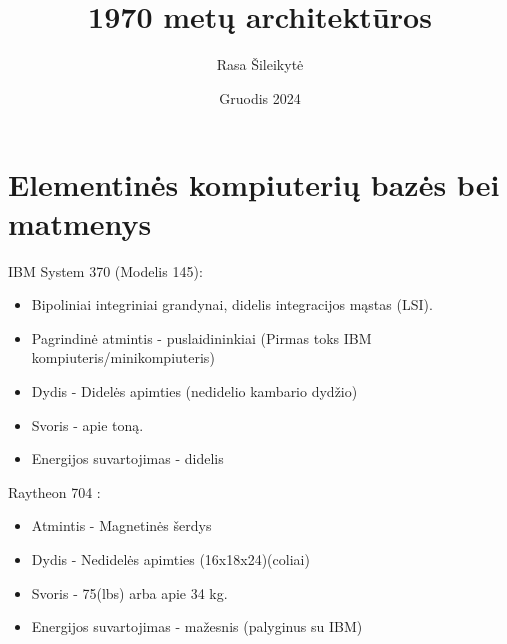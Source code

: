 \documentclass{article}
\title{\bold{IBM System 370 vs. Raytheon 704} \\1970 metų architektūros}
\author{Rasa Šileikytė}
\date{Gruodis 2024}
\begin{document}
\maketitle

\section*{Elementinės kompiuterių bazės bei matmenys}
\begin{multicols}{2}
IBM System 370 (Modelis 145):
\begin{itemize}
\item Bipoliniai integriniai grandynai, didelis integracijos mąstas (LSI).
\item Pagrindinė atmintis - puslaidininkiai (Pirmas toks IBM kompiuteris/minikompiuteris)
\item Dydis - Didelės apimties (nedidelio kambario dydžio)
\item Svoris - apie toną.
\item Energijos suvartojimas - didelis
\end{itemize}

\columnbreak

Raytheon 704 :
\begin{itemize}
\item Atmintis - Magnetinės šerdys
\item Dydis - Nedidelės apimties (16x18x24)(coliai)
\item Svoris - 75(lbs) arba apie 34 kg.
\item Energijos suvartojimas - mažesnis (palyginus su IBM)
\end{itemize}
\end{multicols}
\end{document}
